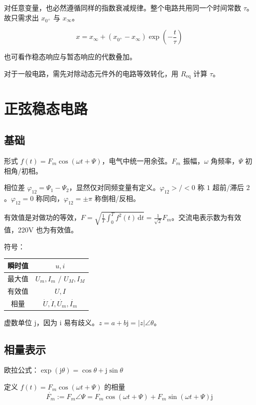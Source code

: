 \documentclass[12pt, a4paper, UTF8, openany]{ctexbook}
\newcommand{\dif}{\mathrm{d}}
\newcommand{\dift}{\,\dif t}
\newcommand{\req}{R_{\text{eq}}}
\newcommand{\unit}{\mathrm{j}}
\begin{document}
        对任意变量，也必然遵循同样的指数衰减规律。整个电路共用同一个时间常数 $\tau$。故只需求出 $x_{0^+}$ 与 $x_{\infty}$。

        $$x = x_{\infty} + (x_{0^+} - x_{\infty})\exp(-\frac{t}{\tau})$$

        也可看作稳态响应与暂态响应的代数叠加。

        对于一般电路，需先对除动态元件外的电路等效转化，用 $\req$ 计算 $\tau$。

    \chapter{正弦稳态电路}
        \section{基础}
        形式 $f(t) = F_m \cos(\omega t + \Psi)$，电气中统一用{\heiti 余弦}。$F_m$ 振幅，$\omega$ 角频率，$\Psi$ 初相角/初相。

        相位差 $\varphi_{12} = \Psi_1 - \Psi_2$，显然仅对同频变量有定义。$\varphi_{12} >/< 0$ 称 $1$ 超前/滞后 $2$。$\varphi_{12} = 0$ 称同向，$\varphi_{12} = \pm\pi$ 称倒相/反相。

        有效值是对{\heiti 做功}的等效，$F = \sqrt{\frac{1}{T} \int_{0}^{T} f^2(t)\dift} = \frac{1}{\sqrt{2}} F_m$。交流电表示数为有效值，220V 也为有效值。

        符号：
        \begin{longtable}[h]{c | c}
            瞬时值 & $u, i$ \\
            \midrule
            最大值 & $U_m, I_m$ / $U_M, I_M$ \\
            \midrule
            有效值 & $U, I$ \\
            \midrule
            相量 & $\dot{U}, \dot{I}, \dot{U_m}, \dot{I_m}$
        \end{longtable}

        虚数单位 $\unit$，因为 $\mathrm{i}$ 易有歧义。$z = a + b\unit = |z|\angle\theta$。
        
        \section{相量表示}
        欧拉公式：$\exp(\unit\theta) = \cos\theta + \unit\sin\theta$

        定义 $f(t) = F_m \cos(\omega t + \Psi)$ 的相量 $$\dot{F_m} := F_m\angle\Psi = F_m\cos(\omega t + \Psi) + F_m\sin(\omega t + \Psi)\unit$$
\end{document}
